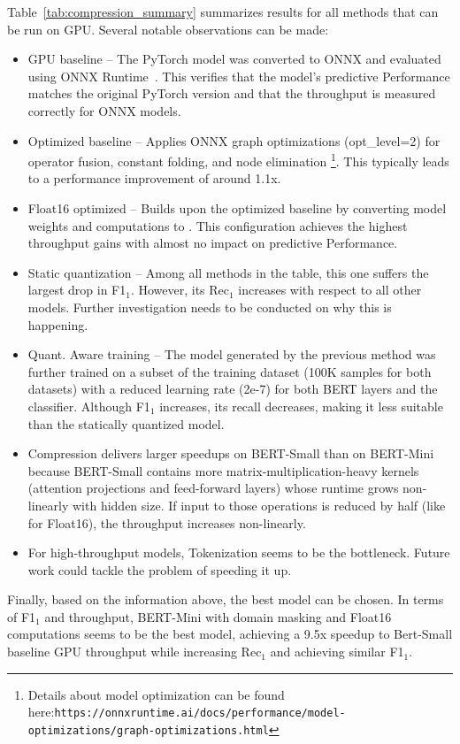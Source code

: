 Table~\ref{tab:compression_summary} summarizes results for all methods that can be run on GPU. Several notable observations can be made:
\begin{itemize}
    \item GPU baseline -- The PyTorch model was converted to ONNX and evaluated using ONNX Runtime~\cite{onnxruntime_2018}. This verifies that the model's predictive Performance matches the original PyTorch version and that the throughput is measured correctly for ONNX models.
    \item Optimized baseline -- Applies ONNX graph optimizations (opt\_level=2) for operator fusion, constant folding, and node elimination \footnote{Details about model optimization can be found here:\nolinkurl{https://onnxruntime.ai/docs/performance/model-optimizations/graph-optimizations.html}}. This typically leads to a performance improvement of around 1.1x.
    \item Float16 optimized -- Builds upon the optimized baseline by converting model weights and computations to . This configuration achieves the highest throughput gains with almost no impact on predictive Performance.
    \item Static quantization -- Among all methods in the table, this one suffers the largest drop in F1$_1$. However, its Rec$_1$ increases with respect to all other models. Further investigation needs to be conducted on why this is happening.
    \item Quant. Aware training -- The model generated by the previous method was further trained on a subset of the training dataset (100K samples for both datasets) with a reduced learning rate (2e-7) for both BERT layers and the classifier. Although F1$_1$ increases, its recall decreases, making it less suitable than the statically quantized model.
    \item Compression delivers larger speedups on BERT-Small than on BERT-Mini because BERT-Small contains more matrix-multiplication-heavy kernels (attention projections and feed-forward layers) whose runtime grows non-linearly with hidden size. If input to those operations is reduced by half (like for Float16), the throughput increases non-linearly.
    \item For high-throughput models, Tokenization seems to be the bottleneck. Future work could tackle the problem of speeding it up.
\end{itemize}

Finally, based on the information above, the best model can be chosen. In terms of F1$_1$ and throughput, BERT-Mini with domain masking and Float16 computations seems to be the best model, achieving a 9.5x speedup to Bert-Small baseline GPU throughput while increasing Rec$_1$ and achieving similar F1$_1$.